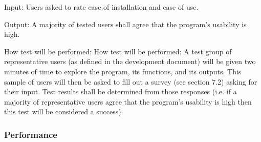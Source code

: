 \documentclass[12pt, titlepage]{article}
\begin{document}
\begin{enumerate}
Input: Users asked to rate ease of installation and ease of use.
					
Output: A majority of tested users shall agree  that the program's usability is 
high.
					
How test will be performed: How test will be performed: A test group of 
representative users (as defined in the development document) will be given two 
minutes of time to explore the program, its functions, and its outputs. This 
sample of users will then be asked to fill out a survey (see section 7.2) asking 
for their input. Test results shall be determined from those responses (i.e. if 
a majority of representative users agree that the program's usability is high 
then this test will be considered a success).

\end{enumerate}

\subsubsection{Performance}
\end{document}
